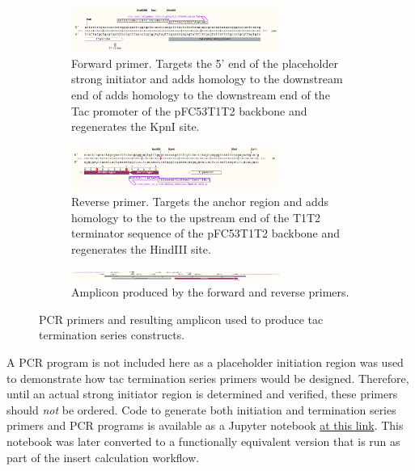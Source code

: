 \documentclass[11pt]{article}
\begin{document}
\begin{figure}[H]
	\centering
	\begin{subfigure}[b]{\textwidth}
		\centering
		\includegraphics[width=0.75\textwidth]{images/primers/t7-term-forward.png}
		\caption{Forward primer. Targets the 5' end of the placeholder strong initiator and adds homology to the downstream end of adds homology to the downstream end of the Tac promoter of the pFC53T1T2 backbone and regenerates the KpnI site.}
		\label{fig:y equals x}
	\end{subfigure}
	\vfill
	\begin{subfigure}[b]{\textwidth}
		\centering
		\includegraphics[width=0.75\textwidth]{images/primers/t7-term-reverse.png}
		\caption{Reverse primer. Targets the anchor region and adds homology to the to the upstream end of the T1T2 terminator sequence of the pFC53T1T2 backbone and regenerates the HindIII site.}
		\label{fig:three sin x}
	\end{subfigure}
	\vfill
	\begin{subfigure}[b]{\textwidth}
		\centering
		\includegraphics[width=0.75\textwidth]{images/primers/t7-term-amplicon.png}
		\caption{Amplicon produced by the forward and reverse primers.}
		\label{fig:three sin x}
	\end{subfigure}
	\caption{PCR primers and resulting amplicon used to produce tac termination series constructs.}
\end{figure}


A PCR program is not included here as a placeholder initiation region was used to demonstrate how tac termination series primers would be designed. Therefore, until an actual strong initiator region is determined and verified, these primers should \emph{not} be ordered. Code to generate both initiation and termination series primers and PCR programs is available as a Jupyter notebook \href{https://github.com/EthanHolleman/plasmid-VR-design/blob/main/notes/tac_series_primers.ipynb}{at this link}. This notebook was later converted to a functionally equivalent version that is run as part of the insert calculation workflow. 
\end{document}
